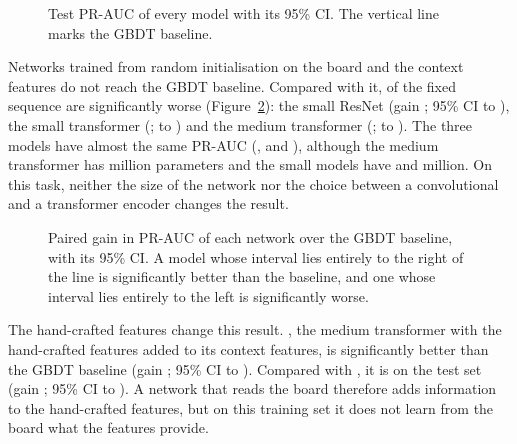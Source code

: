 \documentclass[11pt]{article}
\begin{document}
\begin{table}[htbp]\centering\small
{}
\caption{Main results on the  test positions, best first.
The gain is the paired difference in PR-AUC from  on the
same resampled games. It is positive when the model is better, and bold when
statistically significant.}
\label{tab:leaderboard}
\end{table}

\begin{figure}[htbp]\centering
{}
\caption{Test PR-AUC of every model with its 95\% CI. The vertical line marks
the GBDT baseline.}
\label{fig:scores}
\end{figure}

Networks trained from random initialisation on the board and the context
features do not reach the GBDT baseline. Compared with it,
 of the fixed sequence are significantly worse
(Figure~\ref{fig:gains}): the small ResNet (gain ;
95\% CI  to ), the
small transformer (;
 to )
and the medium transformer (;
 to ).
The three models have almost the same PR-AUC (,
 and ),
although the medium transformer has
 million parameters and the
small models have  and
 million. On this task, neither
the size of the network nor the choice between a convolutional and a
transformer encoder changes the result.

\begin{figure}[htbp]\centering
{}
\caption{Paired gain in PR-AUC of each network over the GBDT baseline, with
its 95\% CI. A model whose interval lies entirely to the right of the line is
significantly better than the baseline, and one whose interval lies entirely
to the left is significantly worse.}
\label{fig:gains}
\end{figure}

The hand-crafted features change this result. ,
the medium transformer with the hand-crafted features added to its context
features, is significantly better than the GBDT baseline (gain
; 95\% CI
 to
).
\ifpairs
Compared with , it is
 on the test set
(gain ; 95\% CI
 to
).
\fi
A network that reads the board therefore adds information to the hand-crafted
features, but on this training set it does not learn from the board what the
features provide.
\end{document}
